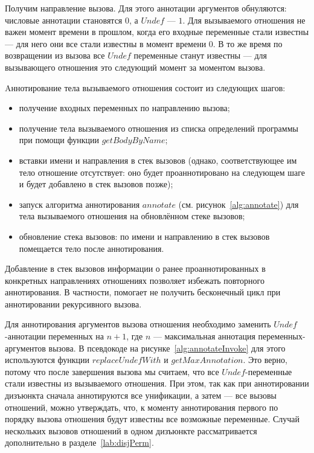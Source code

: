 Получим направление вызова.
Для этого аннотации аргументов обнуляются: числовые аннотации становятся $0$, а $Undef$ --- $1$.
Для вызываемого отношения не важен момент времени в прошлом, когда его входные переменные стали известны --- для него они все стали известны в момент времени $0$.
В то же время по возвращении из вызова все $Undef$ переменные станут известны --- для вызывающего отношения это следующий момент за моментом вызова.

Aннотирование тела вызываемого отношения состоит из следующих шагов:
\begin{itemize}
    \item получение входных переменных по направлению вызова;
    \item получение тела вызываемого отношения из списка определений программы при помощи функции $getBodyByName$;
    \item вставки имени и направления в стек вызовов (однако, соответствующее им тело отношение отсутствует: оно будет проаннотировано на следующем шаге и будет добавлено в стек вызовов позже);
    \item запуск алгоритма аннотирования $annotate$ (см. рисунок~\ref{alg:annotate}) для тела вызываемого отношения на обновлённом стеке вызовов;
    \item обновление стека вызовов: по имени и направлению в стек вызовов помещается тело после аннотирования.
\end{itemize}

Добавление в стек вызовов информации о ранее проаннотированных в конкретных направлениях отношениях позволяет избежать повторного аннотирования.
В частности, помогает не получить бесконечный цикл при аннотировании рекурсивного вызова.

Для аннотирования аргументов вызова отношения необходимо заменить $Undef$-аннотации переменных на $n+1$, где $n$ --- максимальная аннотация переменных-аргументов вызова.
В псевдокоде на рисунке~\ref{alg:annotateInvoke} для этого используются функции $replaceUndefWith$ и $getMaxAnnotation$.
Это верно, потому что после завершения вызова мы считаем, что все $Undef$-переменные стали известны из вызываемого отношения.
При этом, так как при аннотировании дизъюнкта сначала аннотируются все унификации, а затем --- все вызовы отношений, можно утверждать, что, к моменту аннотирования первого по порядку вызова отношения будут известны все возможные переменные.
Случай нескольких вызовов отношений в одном дизъюнкте рассматривается дополнительно в разделе~\ref{lab:disjPerm}.
